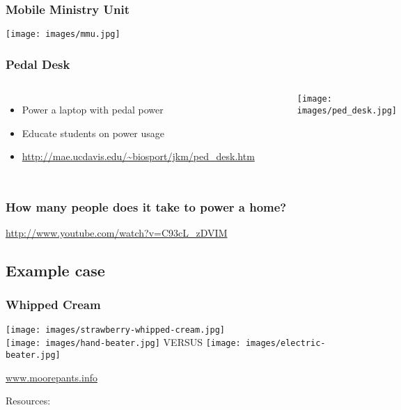 \documentclass[]{beamer}
\begin{document}
\frame
{
    \frametitle{Mobile Ministry Unit}
    \begin{center}
			\texttt{[image: images/mmu.jpg]}
    \end{center}
}
\frame
{
    \frametitle{Pedal Desk}
    \begin{columns}[t]
        \column{6cm}
        \begin{itemize}
            \item Power a laptop with pedal power
            \item Educate students on power usage
						\item \url{http://mae.ucdavis.edu/~biosport/jkm/ped_desk.htm}
        \end{itemize}
        \column{5cm}
        \begin{center}
        \begin{figure}[]
            \texttt{[image: images/ped\_desk.jpg]}
        \end{figure}
        \end{center}
    \end{columns}
}
\frame
{
    \frametitle{How many people does it take to power a home?}
    \url{http://www.youtube.com/watch?v=C93cL_zDVIM}
}
\subsection{Example case}
\frame
{
    \frametitle{Whipped Cream}
		\begin{center}
			\texttt{[image: images/strawberry-whipped-cream.jpg]}
			\\
			\texttt{[image: images/hand-beater.jpg]}
			\large{VERSUS}
			\texttt{[image: images/electric-beater.jpg]}
		\end{center}
}
\begin{frame}[shrink=30]
	\begin{center}
    \alert{\url{www.moorepants.info}}\\
	\end{center}
	Resources:
	\nocite{McCullagh1977}
	\nocite{Wilson1986}
	\nocite{Wilson2004}
	\nocite{Dean2008}
	\nocite{Jansen2011}

	
	\small
\end{frame}
\end{document}
